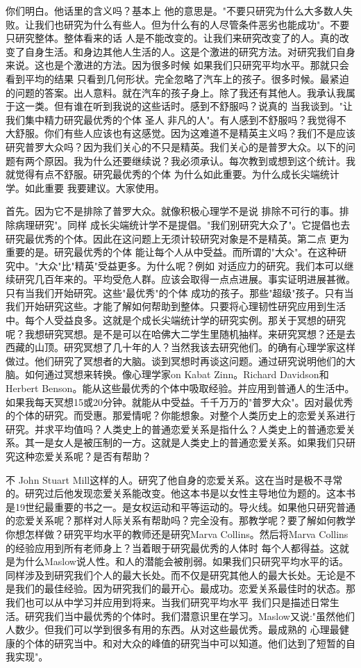 你们明白。他话里的含义吗？基本上 他的意思是。"不要只研究为什么大多数人失败。让我们也研究为什么有些人。但为什么有的人尽管条件恶劣也能成功"。不要只研究整体。整体看来的话 人是不能改变的。让我们来研究改变了的人。真的改变了自身生活。和身边其他人生活的人。这是个激进的研究方法。对研究我们自身来说。这也是个激进的方法。因为很多时候 如果我们只研究平均水平。那就只会看到平均的结果 只看到几何形状。完全忽略了汽车上的孩子。很多时候。最紧迫的问题的答案。出人意料。就在汽车的孩子身上。除了我还有其他人。我承认我属于这一类。但有谁在听到我说的这些话时。感到不舒服吗？说真的 当我谈到。"让我们集中精力研究最优秀的个体 圣人 非凡的人"。有人感到不舒服吗？我觉得不大舒服。你们有些人应该也有这感觉。因为这难道不是精英主义吗？我们不是应该研究普罗大众吗？因为我们关心的不只是精英。我们关心的是普罗大众。以下的问题有两个原因。我为什么还要继续说？我必须承认。每次教到或想到这个统计。我就觉得有点不舒服。研究最优秀的个体 为什么如此重要。为什么成长尖端统计学。如此重要 我要建议。大家使用。 

首先。因为它不是排除了普罗大众。就像积极心理学不是说 排除不可行的事。排除病理研究"。同样 成长尖端统计学不是提倡。"我们别研究大众了"。它提倡也去研究最优秀的个体。因此在这问题上无须计较研究对象是不是精英。第二点 更为重要的是。研究最优秀的个体 能让每个人从中受益。而所谓的"大众"。在这种研究中。"大众"比"精英"受益更多。为什么呢？例如 对适应力的研究。我们本可以继续研究几百年来的。平均受危人群。应该会取得一点点进展。事实证明进展甚微。只有当我们开始研究。这些"最优秀"的个体 成功的孩子。那些"超级"孩子。只有当我们开始研究这些。才能了解如何帮助到整体。只要将心理韧性研究应用到生活中。每个人受益良多。这就是个成长尖端统计学的研究实例。那关于冥想的研究呢？我想研究冥想。是不是可以在哈佛大二学生里随机抽样。来研究冥想？还是去西藏的山顶。研究冥想了几十年的人？当然我该去研究他们。的确有心理学家这样做过。他们研究了冥想者的大脑。谈到冥想时再谈这问题。通过研究说明他们的大脑。如何通过冥想来转换。像心理学家on Kabat Zinn。Richard Davidson和Herbert Benson。能从这些最优秀的个体中吸取经验。并应用到普通人的生活中。如果我每天冥想15或20分钟。就能从中受益。千千万万的"普罗大众"。因对最优秀的个体的研究。而受惠。那爱情呢？你能想象。对整个人类历史上的恋爱关系进行研究。并求平均值吗？人类史上的普通恋爱关系是指什么？人类史上的普通恋爱关系。其一是女人是被压制的一方。这就是人类史上的普通恋爱关系。如果我们只研究这种恋爱关系呢？是否有帮助？ 

不 John Stuart Mill这样的人。研究了他自身的恋爱关系。这在当时是极不寻常的。研究过后他发现恋爱关系能改变。他这本书是以女性主导地位为题的。这本书是19世纪最重要的书之一。是女权运动和平等运动的。导火线。如果他只研究普通的恋爱关系呢？那样对人际关系有帮助吗？完全没有。那教学呢？要了解如何教学 你想怎样做？研究平均水平的教师还是研究Marva Collins。然后将Marva Collins的经验应用到所有老师身上？当着眼于研究最优秀的人体时 每个人都得益。这就是为什么Maslow说人性。和人的潜能会被削弱。如果我们只研究平均水平的话。同样涉及到研究我们个人的最大长处。而不仅是研究其他人的最大长处。无论是不是我们的最佳经验。因为研究我们的最开心。最成功。恋爱关系最佳时的状态。那我们也可以从中学习并应用到将来。当我们研究平均水平 我们只是描述日常生活。研究我们当中最优秀的个体时。我们潜意识里在学习。Maslow又说:"虽然他们人数少。但我们可以学到很多有用的东西。从对这些最优秀。最成熟的 心理最健康的个体的研究当中。和对大众的峰值的研究当中可以知道。他们达到了短暂的自我实现"。 

